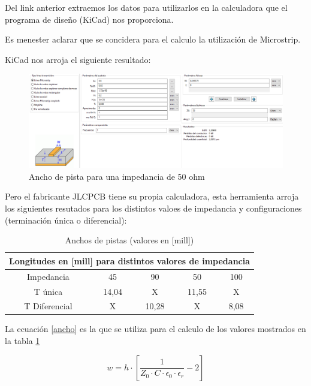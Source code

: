 \documentclass[a4paper,12pt]{report} %
\begin{document}
Del link anterior extraemos los datos para utilizarlos en la calculadora que el programa de diseño (KiCad) nos proporciona.

Es menester aclarar que se concidera para el calculo la utilización de Microstrip.

KiCad nos arroja el siguiente resultado: 

\begin{figure}[H]
	\centering
	\includegraphics[scale=0.4]{Imagenes/PCB/impedancia_kicad}
	\caption{Ancho de pista para una impedancia de 50 ohm}
	\label{impedancia1}
\end{figure}

Pero el fabricante JLCPCB tiene su propia calculadora, esta herramienta arroja los siguientes resutados para los distintos valoes de impedancia y configuraciones (terminación única o diferencial): 

\begin{table} [H]
	\begin{center}
		\begin{tabular}{|c|c|c|c|c|}
			\hline
			\multicolumn{5}{|c|}{Longitudes en [mill] para distintos valores de impedancia} \\ \hline
			Impedancia		& 45 	& 90 	& 50 	& 100 \\ \hline
			T única			& 14,04	& X		& 11,55	& X \\ \hline
			T Diferencial	& X		& 10,28 & X		& 8,08 \\ \hline
		\end{tabular}
	\caption{Anchos de pistas (valores en [mill])}
	\label{impedancias}
	\end{center}
\end{table}


La ecuación \ref{ancho} es la que se utiliza para el calculo de los valores mostrados en la tabla \ref{impedancias}

\begin{equation}
w = h \cdot [\frac{1}{Z_0 \cdot C \cdot \epsilon_0 \cdot \epsilon_r} -2]
\label{ancho}
\end{equation}
\end{document}

